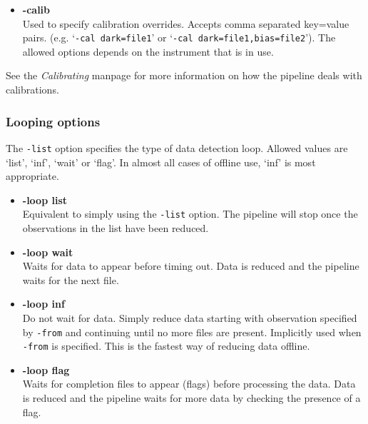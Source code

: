 \documentclass[twoside,11pt]{article}
\renewcommand{\_}{\texttt{\symbol{95}}}
\begin{document}
\begin{itemize}

\item{\bf -calib}
\hfil\\
Used to specify calibration overrides. Accepts comma separated key=value
pairs. (e.g. `{\tt -cal dark=file1}' or `{\tt -cal dark=file1,bias=file2}'). The
allowed options depends on the instrument that is in use.

\end{itemize}

See the {\em Calibrating\/} manpage for more information on how the pipeline deals
with calibrations.

\subsubsection*{Looping options}

The {\tt -list} option specifies the type of data detection loop. Allowed
values are `list', `inf', `wait' or `flag'. In almost all cases of
offline use, `inf' is most appropriate.

\begin{itemize}

\item{\bf -loop list}
\hfil\\
Equivalent to simply using the {\tt -list} option. The pipeline will stop
once the observations in the list have been reduced.

\item{\bf -loop wait}
\hfil\\
Waits for data to appear before timing out. Data is reduced and the pipeline
waits for the next file.

\item{\bf -loop inf}
\hfil\\
Do not wait for data. Simply reduce data starting with observation
specified by {\tt -from} and continuing until no more files are present.
Implicitly used when {\tt -from} is specified. This is the fastest way
of reducing data offline.

\item{\bf -loop flag}
\hfil\\
Waits for completion files to appear (flags) before processing the data.
Data is reduced and the pipeline waits for more data by checking the
presence of a flag.

\end{itemize}
\end{document}
